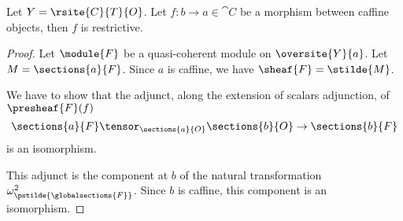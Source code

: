 \begin{theorem}
Let $Y = \rsite{C}{T}{O}$.
Let $f: b \rightarrow a \in \cat{C}$ be a morphism between caffine objects, 
then $f$ is restrictive.
\end{theorem}

\begin{proof}
Let $\module{F}$ be a quasi-coherent module on $\oversite{Y}{a}$.
Let $M = \sections{a}{F}$.
Since $a$ is caffine, we have $\sheaf{F} = \stilde{M}$.

We have to show that the adjunct, along the extension of scalars adjunction, of $\presheaf{F}(f)$
\[\sections{a}{F} \tensor_{\sections{a}{O}} \sections{b}{O} \rightarrow \sections{b}{F}\]
is an isomorphism.

This adjunct is the component at $b$ of the natural transformation $\omega^2_{\pstilde{\globalsections{F}}}$.
Since $b$ is caffine, this component is an isomorphism.







\end{proof}
